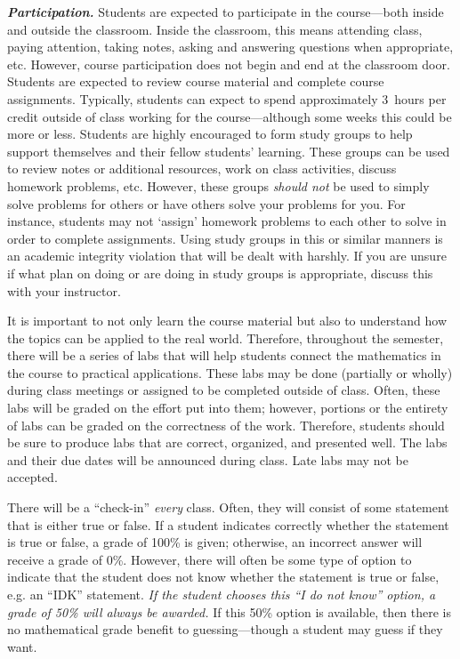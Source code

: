 \documentclass[11pt,letterpaper]{article}
\begin{document}
{\itshape\bfseries\color{scred}Participation.} 
Students are expected to participate in the course---both inside and outside the classroom. Inside the classroom, this means attending class, paying attention, taking notes, asking and answering questions when appropriate, etc. However, course participation does not begin and end at the classroom door. Students are expected to review course material and complete course assignments. Typically, students can expect to spend approximately 3~hours per credit outside of class working for the course---although some weeks this could be more or less. Students are highly encouraged to form study groups to help support themselves and their fellow students' learning. These groups can be used to review notes or additional resources, work on class activities, discuss homework problems, etc. However, these groups {\itshape should not} be used to simply solve problems for others or have others solve your problems for you. For instance, students may not `assign' homework problems to each other to solve in order to complete assignments. Using study groups in this or similar manners is an academic integrity violation that will be dealt with harshly. If you are unsure if what plan on doing or are doing in study groups is appropriate, discuss this with your instructor. \par\vspace{0.8cm}




It is important to not only learn the course material but also to understand how the topics can be applied to the real world. Therefore, throughout the semester, there will be a series of labs that will help students connect the mathematics in the course to practical applications. These labs may be done (partially or wholly) during class meetings or assigned to be completed outside of class. Often, these labs will be graded on the effort put into them; however, portions or the entirety of labs can be graded on the correctness of the work. Therefore, students should be sure to produce labs that are correct, organized, and presented well. The labs and their due dates will be announced during class. Late labs may not be accepted. 
\sectionbreak




There will be a ``check-in'' \textit{every} class. Often, they will consist of some statement that is either true or false. If a student indicates correctly whether the statement is true or false, a grade of 100\% is given; otherwise, an incorrect answer will receive a grade of 0\%. However, there will often be some type of option to indicate that the student does not know whether the statement is true or false, e.g. an ``IDK'' statement. {\itshape If the student chooses this ``I do not know'' option, a grade of 50\% will always be awarded.} If this 50\% option is available, then there is no mathematical grade benefit to guessing---though a student may guess if they want. \pspace
\end{document}
